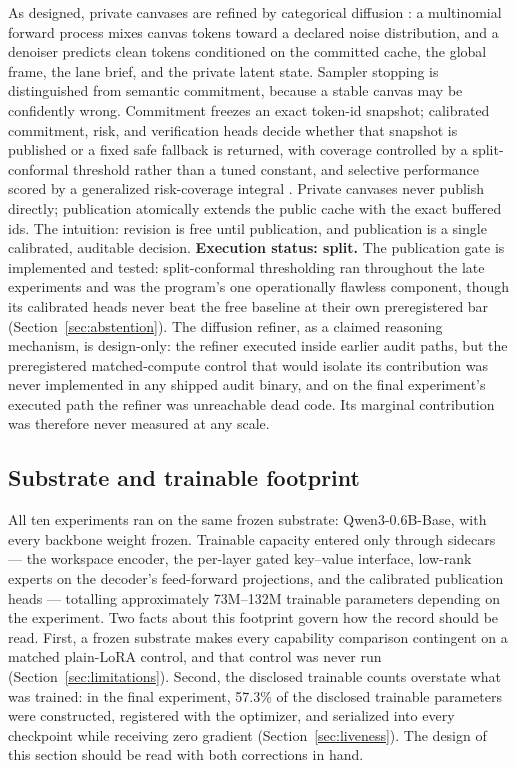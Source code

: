 \documentclass[10pt,a4paper]{article}
\begin{document}
As designed, private canvases are refined by categorical diffusion
\cite{austin2021,nie2025,arriola2025,diffusiongemma}: a multinomial forward
process mixes canvas tokens toward a declared noise distribution, and a
denoiser predicts clean tokens conditioned on the committed cache, the
global frame, the lane brief, and the private latent state. Sampler stopping
is distinguished from semantic commitment, because a stable canvas may be
confidently wrong. Commitment freezes an exact token-id snapshot; calibrated
commitment, risk, and verification heads \cite{geifman2017,guo2017} decide
whether that snapshot is published or a fixed safe fallback is returned,
with coverage controlled by a split-conformal threshold
\cite{vovk2005,angelopoulos2021} rather than a tuned constant, and selective
performance scored by a generalized risk-coverage integral \cite{traub2024}.
Private canvases never publish directly; publication atomically extends the
public cache with the exact buffered ids. The intuition: revision is free
until publication, and publication is a single calibrated, auditable
decision. \textbf{Execution status: split.} The publication gate is
implemented and tested: split-conformal thresholding ran throughout the late
experiments and was the program's one operationally flawless component,
though its calibrated heads never beat the free baseline at their own
preregistered bar (Section~\ref{sec:abstention}). The diffusion refiner, as
a claimed reasoning mechanism, is design-only: the refiner executed inside
earlier audit paths, but the preregistered matched-compute control that
would isolate its contribution was never implemented in any shipped audit
binary, and on the final experiment's executed path the refiner was
unreachable dead code. Its marginal contribution was therefore never
measured at any scale.

\subsection{Substrate and trainable footprint}

All ten experiments ran on the same frozen substrate: Qwen3-0.6B-Base, with
every backbone weight frozen. Trainable capacity entered only through
sidecars --- the workspace encoder, the per-layer gated key--value interface,
low-rank experts on the decoder's feed-forward projections, and the
calibrated publication heads --- totalling approximately 73M--132M trainable
parameters depending on the experiment. Two facts about this footprint
govern how the record should be read. First, a frozen substrate makes every
capability comparison contingent on a matched plain-LoRA control, and that
control was never run (Section~\ref{sec:limitations}). Second, the disclosed
trainable counts overstate what was trained: in the final experiment, 57.3\%
of the disclosed trainable parameters were constructed, registered with the
optimizer, and serialized into every checkpoint while receiving zero
gradient (Section~\ref{sec:liveness}). The design of this section should be
read with both corrections in hand.
\end{document}
